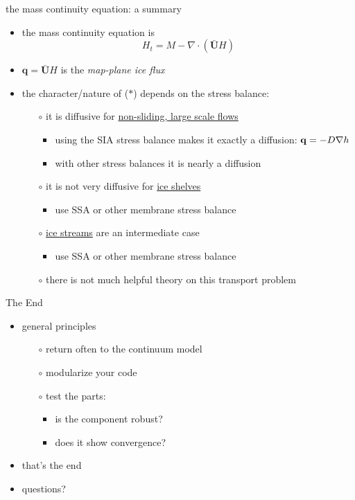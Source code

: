 \begin{frame}{the mass continuity equation: a summary}

\begin{itemize}
\item the \alert{mass continuity equation} is
  \begin{equation}
  H_t = M - \nabla \cdot \left(\bar{\mathbf{U}} H\right)  \tag{$\ast$}
  \end{equation}
\item $\mathbf{q} = \bar{\mathbf{U}} H$ is the \emph{map-plane ice flux}
\item the character/nature of ($\ast$) depends on the stress balance:
  \begin{itemize}
  \item[$\circ$] it is \alert{diffusive} for \underline{non-sliding, large scale flows}
    \begin{itemize}
    \item using the SIA stress balance makes it exactly a diffusion: $\mathbf{q} = - D \nabla h$
    \item with other stress balances it is nearly a diffusion
    \end{itemize}
  \item[$\circ$] it is \alert{not very diffusive} for \underline{ice shelves}
    \begin{itemize}
    \item use SSA or other membrane stress balance
    \end{itemize}
  \item[$\circ$] \underline{ice streams} are an intermediate case
    \begin{itemize}
    \item use SSA or other membrane stress balance
    \end{itemize}
  \item[$\circ$] there is not much helpful theory on this transport problem
  \end{itemize}
\end{itemize}
\end{frame}


\begin{frame}{The End}

\begin{itemize}
\item general principles
  \begin{itemize}
  \item[$\circ$] \alert{return often to the continuum model}
  \item[$\circ$] \alert{modularize your code}
  \item[$\circ$] \alert{test the parts}:
    \begin{itemize}
    \item is the component robust?
    \item does it show convergence?
    \end{itemize}
  \end{itemize}

\bigskip
\item that's the end
\item \alert{questions?}
\end{itemize}
\end{frame}
